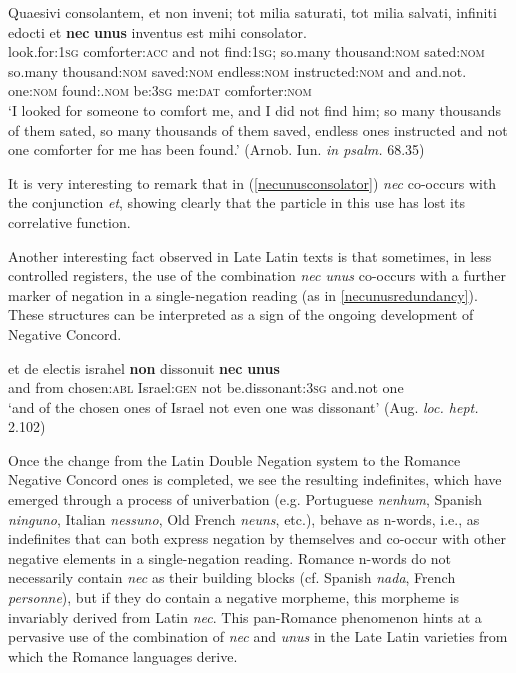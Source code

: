 \documentclass[output=paper,modfonts,nonflat,citecolor=brown,
showindex
]{langsci/langscibook}
\begin{document}
{\begin{exe}
\ex \label{necunusconsolator} \gll Quaesivi consolantem, et non inveni; tot milia saturati, tot milia salvati, infiniti edocti et {\textbf{nec}} {\textbf{unus}} inventus est mihi consolator.\\
look.for:{\textsc{1sg}} comforter:{\textsc{acc}} and not find:{\textsc{1sg}}; so.many thousand:{\textsc{nom}} sated:{\textsc{nom}} so.many thousand:{\textsc{nom}} saved:{\textsc{nom}} endless:{\textsc{nom}} instructed:{\textsc{nom}} and and.not. one:{\textsc{nom}} found:{\ptcp}.{\textsc{nom}} be:{\textsc{3sg}} me:{\textsc{dat}} comforter:{\textsc{nom}}\\

`I looked for someone to comfort me, and I did not find him; so many thousands of them sated, so many thousands of them saved, endless ones instructed and not one comforter for me has been found.' (Arnob. Iun. {\emph{in psalm.}} 68.35)
\end{exe}}

\noindent It is very interesting to remark that in (\ref{necunusconsolator}) {\emph{nec}} co-occurs with the conjunction {\emph{et}}, showing clearly that the particle in this use has lost its correlative function.

Another interesting fact observed in Late Latin texts is that sometimes, in less controlled registers, the use of the combination {\emph{nec unus}} co-occurs with a further marker of negation in a single-negation reading (as in \ref{necunusredundancy}). These structures can be interpreted as a sign of the ongoing development of Negative Concord.

{\begin{exe}
\ex \label{necunusredundancy} \gll et de electis israhel {\textbf{non}} dissonuit {\textbf{nec}} {\textbf{unus}}\\
and from chosen:{\textsc{abl}} Israel:{\textsc{gen}} not be.dissonant:{\textsc{3sg}} and.not one\\

`and of the chosen ones of Israel not even one was dissonant' (Aug. {\emph{loc. hept.}} 2.102)
\end{exe}}

\noindent Once the change from the Latin Double Negation system to the Romance Negative Concord ones is completed, we see the resulting indefinites, which have emerged through a process of univerbation (e.g. Portuguese {\emph{nenhum}}, Spanish {\emph{ninguno}}, Italian {\emph{nessuno}}, Old French {\emph{neuns}}, etc.), behave as n-words, i.e., as indefinites that can both express negation by themselves and co-occur with other negative elements in a single-negation reading. Romance n-words do not necessarily contain {\emph{nec}} as their building blocks (cf. Spanish {\emph{nada}}, French {\emph{personne}}), but if they do contain a negative morpheme, this morpheme is invariably derived from Latin {\emph{nec}}. This pan-Romance phenomenon hints at a pervasive use of the combination of {\emph{nec}} and {\emph{unus}} in the Late Latin varieties from which the Romance languages derive.
\end{document}

